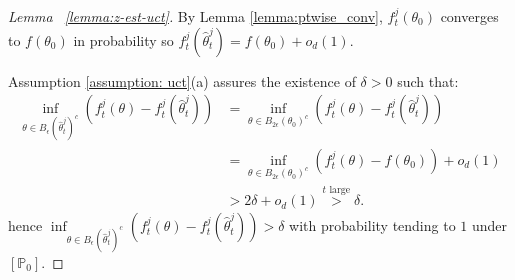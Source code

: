 \documentclass[twoside,11pt]{article}
\numberwithin{equation}{section}
\newcommand\bP{\mathbb{P}}
\begin{document}
{\begin{proof}[Lemma ~\ref{lemma:z-est-uct}]
By Lemma \ref{lemma:ptwise_conv}, $f_t^j(\theta_0)$ converges to $f(\theta_0)$ in probability so $f_t^j(\hat\theta_t^j) = f(\theta_0) + o_d(1)$. 

Assumption \ref{assumption: uct}(a) assures the existence of $\delta > 0$ such that:
\begin{align*}
    \inf_{\theta \in B_\epsilon(\hat\theta_t^j)^c} (f_t^j(\theta) - f_t^j(\hat\theta_t^j)) &= \inf_{\theta \in B_{2\epsilon}(\theta_0)^c} (f_t^j(\theta) - f_t^j(\hat\theta_t^j)) \\
    &=  \inf_{\theta \in B_{2\epsilon}(\theta_0)^c} (f_t^j(\theta) - f(\theta_0)) + o_d(1) \\
    & > 2\delta + o_d(1) \overset{\text{$t$ large}}{>} \delta. 
\end{align*}
hence $\inf_{\theta \in B_\epsilon(\hat\theta_t^j)^c} (f_t^j(\theta) - f_t^j(\hat\theta_t^j)) > \delta$ with probability tending to $1$ under $[\bP_0]$.
\end{proof}

}
\end{document}
